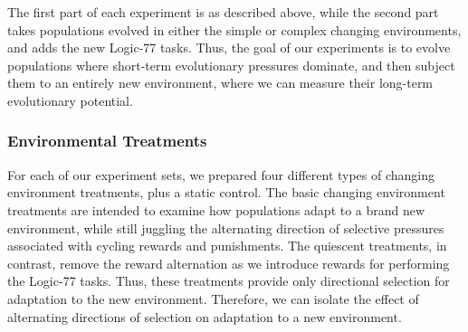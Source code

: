 \documentclass[PhD]{msu-thesis}
\begin{document}
The first part of each experiment is as described above, while the second part takes populations evolved in either the simple or complex changing environments, and adds the new Logic-77 tasks. Thus, the goal of our experiments is to evolve populations where short-term evolutionary pressures dominate, and then subject them to an entirely new environment, where we can measure their long-term evolutionary potential.


\subsubsection{Environmental Treatments}
For each of our experiment sets, we prepared four different types of changing environment treatments, plus a static control. The basic changing environment treatments are intended to examine how populations adapt to a brand new environment, while still juggling the alternating direction of selective pressures associated with cycling rewards and punishments. The quiescent treatments, in contrast, remove the reward alternation as we introduce rewards for performing the Logic-77 tasks. Thus, these treatments provide only directional selection for adaptation to the new environment. Therefore, we can isolate the effect of alternating directions of selection on adaptation to a new environment. 
\end{document}
